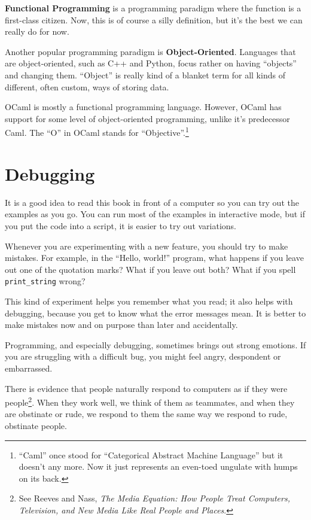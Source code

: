 \documentclass[10pt]{book}
\begin{document}

{\bf Functional Programming} is a programming paradigm where the function is a
first-class citizen. Now, this is of course a silly definition, but
it's the best we can really do for now.

Another popular programming paradigm is {\bf
  Object-Oriented}. Languages that are object-oriented, such as C++
and Python, focus rather on having ``objects'' and changing
them. ``Object'' is really kind of a blanket term for all kinds of
different, often custom, ways of storing data.

OCaml is mostly a functional programming language. However, OCaml has support for some level of object-oriented programming, unlike it's predecessor Caml. The ``O'' in OCaml stands for ``Objective''.\footnote{``Caml'' once stood for ``Categorical Abstract Machine Language'' but it doesn't any more. Now it just represents an even-toed ungulate with humps on its back.}

\section{Debugging}

It is a good idea to read this book in front of a computer so you can try out the examples as you go.  You can run most of the examples in interactive mode, but if you put the code into a script, it is easier to try out variations.

Whenever you are experimenting with a new feature, you should try to make mistakes.  For example, in the ``Hello, world!'' program, what happens if you leave out one of the quotation marks?  What if you leave out both?  What if you spell {\tt print\verb"_"string} wrong?


This kind of experiment helps you remember what you read; it also helps with debugging, because you get to know what the error messages mean. It is better to make mistakes now and on purpose than later and accidentally.

Programming, and especially debugging, sometimes brings out strong emotions.  If you are struggling with a difficult bug, you might feel angry, despondent or embarrassed.

There is evidence that people naturally respond to computers as if they were people\footnote{See Reeves and Nass, {\it The Media Equation: How People Treat Computers, Television, and New Media Like Real People and Places}.}.  When they work well, we think of them as teammates, and when they are obstinate or rude, we respond to them the same way we respond to rude, obstinate people.
\end{document}

